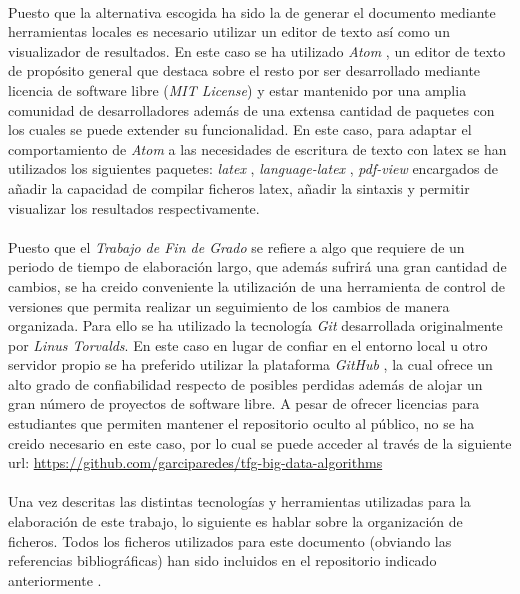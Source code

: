 \documentclass{subfiles}
\begin{document}
    \paragraph{}
    Puesto que la alternativa escogida ha sido la de generar el documento mediante herramientas locales es necesario utilizar un editor de texto así como un visualizador de resultados. En este caso se ha utilizado \emph{Atom} \cite{tool:atom}, un editor de texto de propósito general que destaca sobre el resto por ser desarrollado mediante licencia de software libre (\emph{MIT License}) y estar mantenido por una amplia comunidad de desarrolladores además de una extensa cantidad de paquetes con los cuales se puede extender su funcionalidad. En este caso, para adaptar el comportamiento de \emph{Atom} a las necesidades de escritura de texto con latex se han utilizados los siguientes paquetes: \emph{latex} \cite{tool:atom-latex}, \emph{language-latex} \cite{tool:atom-language-latex}, \emph{pdf-view} \cite{tool:atom-pdf-view} encargados de añadir la capacidad de compilar ficheros latex, añadir la sintaxis y permitir visualizar los resultados respectivamente.

    \paragraph{}
    Puesto que el \emph{Trabajo de Fin de Grado} se refiere a algo que requiere de un periodo de tiempo de elaboración largo, que además sufrirá una gran cantidad de cambios, se ha creido conveniente la utilización de una herramienta de control de versiones que permita realizar un seguimiento de los cambios de manera organizada. Para ello se ha utilizado la tecnología \emph{Git} \cite{tool:git} desarrollada originalmente por \emph{Linus Torvalds}. En este caso en lugar de confiar en el entorno local u otro servidor propio se ha preferido utilizar la plataforma \emph{GitHub} \cite{tool:github}, la cual ofrece un alto grado de confiabilidad respecto de posibles perdidas además de alojar un gran número de proyectos de software libre. A pesar de ofrecer licencias para estudiantes que permiten mantener el repositorio oculto al público, no se ha creido necesario en este caso, por lo cual se puede acceder al través de la siguiente url: \url{https://github.com/garciparedes/tfg-big-data-algorithms} \cite{garciparedes:tfg-big-data-algorithms}

    \paragraph{}
    Una vez descritas las distintas tecnologías y herramientas utilizadas para la elaboración de este trabajo, lo siguiente es hablar sobre la organización de ficheros. Todos los ficheros utilizados para este documento (obviando las referencias bibliográficas) han sido incluidos en el repositorio indicado anteriormente \cite{garciparedes:tfg-big-data-algorithms}.
\end{document}
